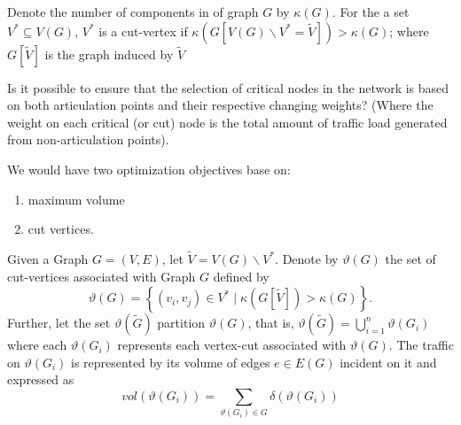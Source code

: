 Denote the number of components in of graph $G$ by $\kappa(G)$. For the a set $V^* \subseteq V(G)$, $V^*$ is a cut-vertex
if $\kappa(G[V(G)\backslash V^* = \tilde{V} ]) > \kappa(G)$; where  $G[\tilde{V}]$ is the graph induced by $\tilde{V}$

\begin{question}
  \label{pythagorean}
  Is it possible to ensure that the selection of critical nodes in the network is based on both articulation points and their respective changing weights?
  (Where the weight on each critical (or cut) node is the total amount of traffic load generated from non-articulation points).
\end{question}

\begin{approach}
  We would have two optimization objectives base on:
  \begin{enumerate}
    \item maximum volume
    \item cut vertices.
  \end{enumerate}
\end{approach}


\begin{problem}
Given a Graph $G = (V, E)$, let $ \tilde{V} = V(G)\backslash V^*$. Denote by $\vartheta (G)$ the set of cut-vertices associated with Graph $G$ defined by
\begin{equation}
  \vartheta (G) =\left\{(v_i, v_j)\in V^* \; \vert \; \kappa(G[\tilde{V} ]) > \kappa(G)\right\}.
\end{equation}
Further, let the set $\vartheta (\tilde{G} )$ partition  $\vartheta (G)$, that is,
$\vartheta (\tilde{G}) = \bigcup_{i=1}^n \vartheta (G_i)$ where each  $\vartheta (G_i)$ represents each
vertex-cut associated with $\vartheta (G)$. The traffic on $\vartheta (G_i)$ is represented by its volume
of edges $e \in E(G)$
incident on it and expressed as
\begin{equation}
  vol(\vartheta (G_i)) = \sum_{\vartheta (G_i)\in G} \delta(\vartheta (G_i))
\end{equation}

\end{problem}